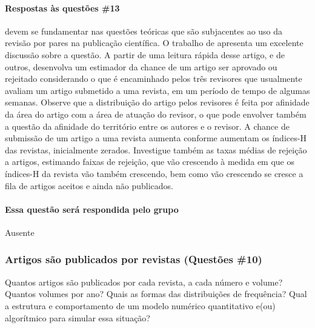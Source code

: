 \paragraph{Respostas às questões \#13} devem se fundamentar nas questões teóricas que são subjacentes ao uso da revisão por pares na publicação científica. O trabalho de \cite{kovanis_evaluating_2017} apresenta um excelente discussão sobre a questão.
A partir de uma leitura rápida desse artigo, e de outros, desenvolva um estimador da chance de um artigo ser aprovado ou rejeitado considerando o que é encaminhado pelos três revisores que usualmente avaliam um artigo submetido a uma revista, em um período de tempo de algumas semanas. Observe que a distribuição do artigo pelos revisores é feita por afinidade da área do artigo com a área de atuação do revisor, o que pode envolver também a questão da afinidade do território entre os autores e o revisor. A chance de submissão de um artigo a uma revista aumenta conforme aumentam os índices-H das revistas, inicialmente zerados. Investigue também as taxas médias de rejeição a artigos, estimando faixas de rejeição, que vão crescendo à medida em que os índices-H da revista vão também crescendo, bem como vão crescendo se cresce a fila de artigos aceitos e ainda não publicados.

\paragraph{Essa questão será respondida pelo grupo}
Ausente

\subsubsection{Artigos são publicados por revistas (Questões \#10)} Quantos artigos são publicados por cada revista, a cada número e volume? Quantos volumes por ano? Quais as formas das distribuições de frequência? Qual a estrutura e comportamento de um modelo numérico quantitativo e(ou) algorítmico para simular essa situação?

